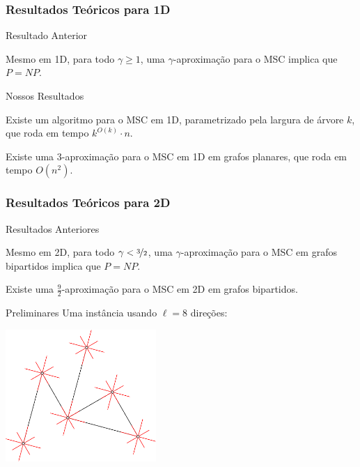 \subsubsection{Resultados Teóricos para 1D}

\begin{frame}{Resultado Anterior}
  \begin{thm}
    Mesmo em 1D, para todo $\gamma \geq 1$, uma $\gamma$-aproximação para o MSC implica que $P = NP$.
  \end{thm}
\end{frame}

\begin{frame}{Nossos Resultados}
  \begin{thm}
    Existe um algoritmo \FPT para o MSC em 1D, parametrizado pela largura de árvore $k$, que roda em tempo $k^{O(k)} \cdot n$.
  \end{thm}

  \pause
  \begin{cor}
    Existe uma $3$-aproximação para o MSC em 1D em grafos planares, que roda em tempo $O(n^2)$.
  \end{cor}
\end{frame}


\subsubsection{Resultados Teóricos para 2D}

\begin{frame}{Resultados Anteriores}
  \begin{thm}
    Mesmo em 2D, para todo $\gamma < \nicefrac{3}{2}$, uma $\gamma$-aproximação para o MSC em grafos bipartidos implica que $P = NP$.
  \end{thm}

  \pause
  \begin{thm}
    Existe uma $\frac{9}{2}$-aproximação para o MSC em 2D em grafos bipartidos.
  \end{thm}
\end{frame}

\begin{frame}{Preliminares}
  \centering
  Uma instância usando $\ell=8$ direções:

  \bigskip
  \begin{minipage}{\linewidth}
    \centering
    \includegraphics[height=5cm]{MSC/directions.png}
  \end{minipage}
\end{frame}

